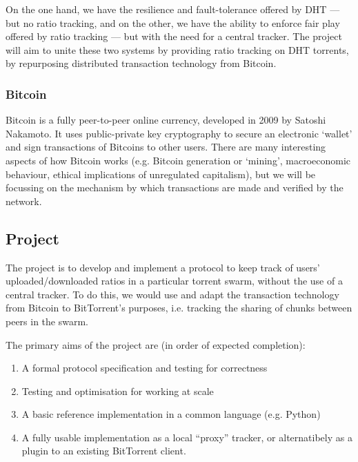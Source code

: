 \documentclass{article}
\begin{document}
On the one hand, we have the resilience and fault-tolerance offered by DHT --- but no ratio tracking, and on the other, we have the ability to enforce fair play offered by ratio tracking --- but with the need for a central tracker.  The project will aim to unite these two systems by providing ratio tracking on DHT torrents, by repurposing distributed transaction technology from Bitcoin.

\subsubsection{Bitcoin}
Bitcoin is a fully peer-to-peer online currency, developed in 2009 by Satoshi Nakamoto.  It uses public-private key cryptography to secure an electronic `wallet' and sign transactions of Bitcoins to other users.  There are many interesting aspects of how Bitcoin works (e.g. Bitcoin generation or `mining', macroeconomic behaviour, ethical implications of unregulated capitalism), but we will be focussing on the mechanism by which transactions are made and verified by the network.

\subsection{Project}

The project is to develop and implement a protocol to keep track of users' uploaded/downloaded ratios in a particular torrent swarm, without the use of a central tracker.  To do this, we would use and adapt the transaction technology from Bitcoin to BitTorrent's purposes, i.e. tracking the sharing of chunks between peers in the swarm.


The primary aims of the project are (in order of expected completion):
\begin{enumerate}
\item A formal protocol specification and testing for correctness
\item Testing and optimisation for working at scale
\item A basic reference implementation in a common language (e.g. Python)
\item A fully usable implementation as a local ``proxy'' tracker, or alternatibely as a plugin to an existing BitTorrent client.
\end{enumerate}

\end{document}
